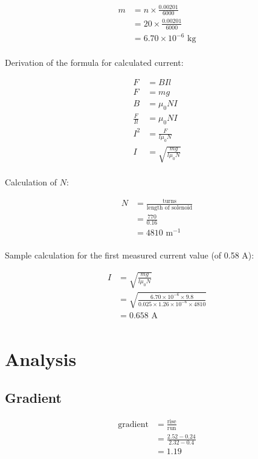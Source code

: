 \documentclass[a4paper,11pt]{article}
\begin{document}
$$
\begin{aligned}
m & = n \times \frac{0.00201}{6000} \\
& = 20 \times \frac{0.00201}{6000} \\
& = 6.70 \times 10^{-6}\mbox{ kg} \\
\end{aligned}
$$

Derivation of the formula for calculated current:

$$
\begin{aligned}
	F & = BIl \\
	F & = mg \\
	B & = \mu_0 NI \\
	\frac{F}{Il} & = \mu_0 NI \\
	I^2 & = \frac{F}{l \mu_0 N} \\
	I & = \sqrt{\frac{mg}{l \mu_0 N}} \\
\end{aligned}
$$

Calculation of $N$:

$$
\begin{aligned}
	N & = \frac{\mbox{turns}}{\mbox{length of solenoid}} \\
	& = \frac{770}{0.16} \\
	& = 4810\mbox{ m}^{-1} \\
\end{aligned}
$$

Sample calculation for the first measured current value (of 0.58 A):

$$
\begin{aligned}
	I & = \sqrt{\frac{m g}{l \mu_0 N}} \\
	& = \sqrt{\frac{6.70 \times 10^{-6} \times 9.8}{0.025 \times 1.26 \times 10^{-6} \times 4810}} \\
	& = 0.658\mbox{ A} \\
\end{aligned}
$$


\section{Analysis}

\subsection{Gradient}

$$
\begin{aligned}
\mbox{gradient} & = \frac{\mbox{rise}}{\mbox{run}} \\
& = \frac{2.52 - 0.24}{2.32 - 0.4} \\
& = 1.19 \\
\end{aligned}
$$
\end{document}
